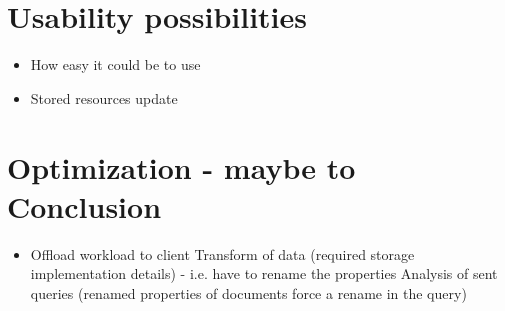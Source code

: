 \section{Usability possibilities}
\begin{itemize}
	\item How easy it could be to use
	\item Stored resources update
\end{itemize}

\section{Optimization - maybe to Conclusion}
\begin{itemize}
	\item Offload workload to client
		\subitem Transform of data (required storage implementation details) - i.e. have to rename the properties
		\subitem Analysis of sent queries (renamed properties of documents force a rename in the query)
\end{itemize}





